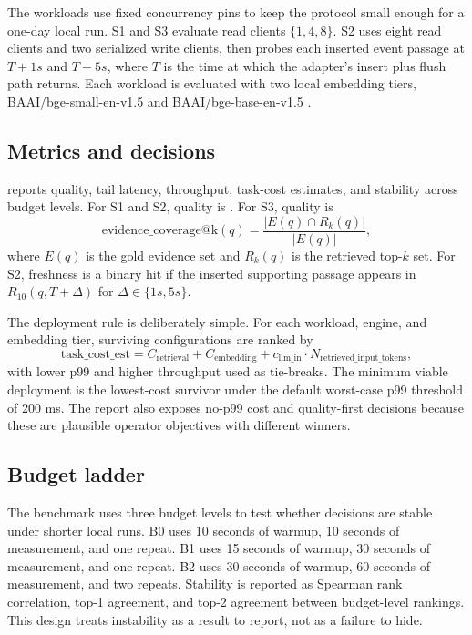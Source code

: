 The workloads use fixed concurrency pins to keep the protocol small enough for a one-day local run. S1 and S3 evaluate read clients $\{1,4,8\}$. S2 uses eight read clients and two serialized write clients, then probes each inserted event passage at $T+1s$ and $T+5s$, where $T$ is the time at which the adapter's insert plus flush path returns. Each workload is evaluated with two local embedding tiers, BAAI/bge-small-en-v1.5 and BAAI/bge-base-en-v1.5 \citep{bge}.

\subsection{Metrics and decisions}

\sys reports quality, tail latency, throughput, task-cost estimates, and stability across budget levels. For S1 and S2, quality is \ndcg. For S3, quality is
\[
\mathrm{evidence\_coverage@k}(q)=\frac{|E(q)\cap R_k(q)|}{|E(q)|},
\]
where $E(q)$ is the gold evidence set and $R_k(q)$ is the retrieved top-$k$ set. For S2, freshness is a binary hit if the inserted supporting passage appears in $R_{10}(q,T+\Delta)$ for $\Delta\in\{1s,5s\}$.

The deployment rule is deliberately simple. For each workload, engine, and embedding tier, surviving configurations are ranked by
\[
\mathrm{task\_cost\_est}=C_{\mathrm{retrieval}}+C_{\mathrm{embedding}}+c_{\mathrm{llm\_in}}\cdot N_{\mathrm{retrieved\_input\_tokens}},
\]
with lower p99 and higher throughput used as tie-breaks. The minimum viable deployment is the lowest-cost survivor under the default worst-case p99 threshold of 200 ms. The report also exposes no-p99 cost and quality-first decisions because these are plausible operator objectives with different winners.

\subsection{Budget ladder}

The benchmark uses three budget levels to test whether decisions are stable under shorter local runs. B0 uses 10 seconds of warmup, 10 seconds of measurement, and one repeat. B1 uses 15 seconds of warmup, 30 seconds of measurement, and one repeat. B2 uses 30 seconds of warmup, 60 seconds of measurement, and two repeats. Stability is reported as Spearman rank correlation, top-1 agreement, and top-2 agreement between budget-level rankings. This design treats instability as a result to report, not as a failure to hide.
